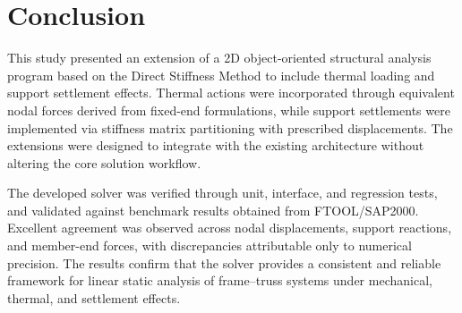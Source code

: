 \chapter{Conclusion}

This study presented an extension of a 2D object-oriented structural analysis program based on the Direct Stiffness Method to include thermal loading and support settlement effects. Thermal actions were incorporated through equivalent nodal forces derived from fixed-end formulations, while support settlements were implemented via stiffness matrix partitioning with prescribed displacements. The extensions were designed to integrate with the existing architecture without altering the core solution workflow.

The developed solver was verified through unit, interface, and regression tests, and validated against benchmark results obtained from FTOOL/SAP2000. Excellent agreement was observed across nodal displacements, support reactions, and member-end forces, with discrepancies attributable only to numerical precision. The results confirm that the solver provides a consistent and reliable framework for linear static analysis of frame--truss systems under mechanical, thermal, and settlement effects.
